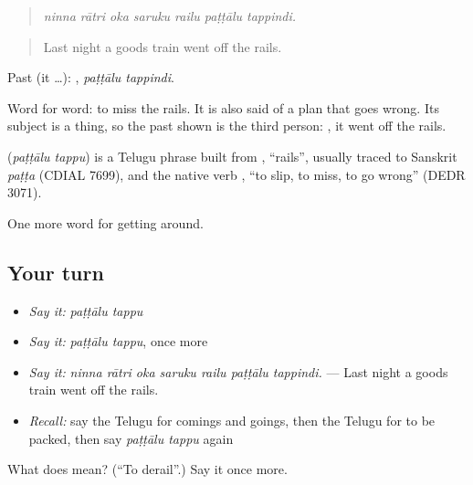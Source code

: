 \begin{quote}
\emph{ninna rātri oka saruku railu paṭṭālu tappindi.}
\end{quote}

\begin{quote}
Last night a goods train went off the rails.
\end{quote}

Past (it …):  , \emph{paṭṭālu tappindi}.

Word for word: to miss the rails. It is also said of a plan that goes wrong. Its subject is a thing, so the past shown is the third person:  , it went off the rails.

\begin{cousinweb}
\textbf{ } (\emph{paṭṭālu tappu}) is a Telugu phrase built from , \textquotedblleft{}rails\textquotedblright{}, usually traced to Sanskrit \emph{paṭṭa} (CDIAL 7699), and the native verb , \textquotedblleft{}to slip, to miss, to go wrong\textquotedblright{} (DEDR 3071).
\end{cousinweb}

\begin{grammarlens}[title={What you've built}]
One more word for getting around.
\end{grammarlens}

\subsection*{Your turn}
\begin{itemize}
\raggedright
  \item \emph{Say it:} \emph{paṭṭālu tappu}
  \item \emph{Say it:} \emph{paṭṭālu tappu}, once more
  \item \emph{Say it:} \emph{ninna rātri oka saruku railu paṭṭālu tappindi.} — Last night a goods train went off the rails.
  \item \emph{Recall:} say the Telugu for comings and goings, then the Telugu for to be packed, then say \emph{paṭṭālu tappu} again
\end{itemize}

\begin{tcolorbox}[breakable,colback=teal!4,colframe=teal!35!black,title={Before you move on}]
What does   mean? (\textquotedblleft{}To derail\textquotedblright{}.) Say it once more.
\end{tcolorbox}
